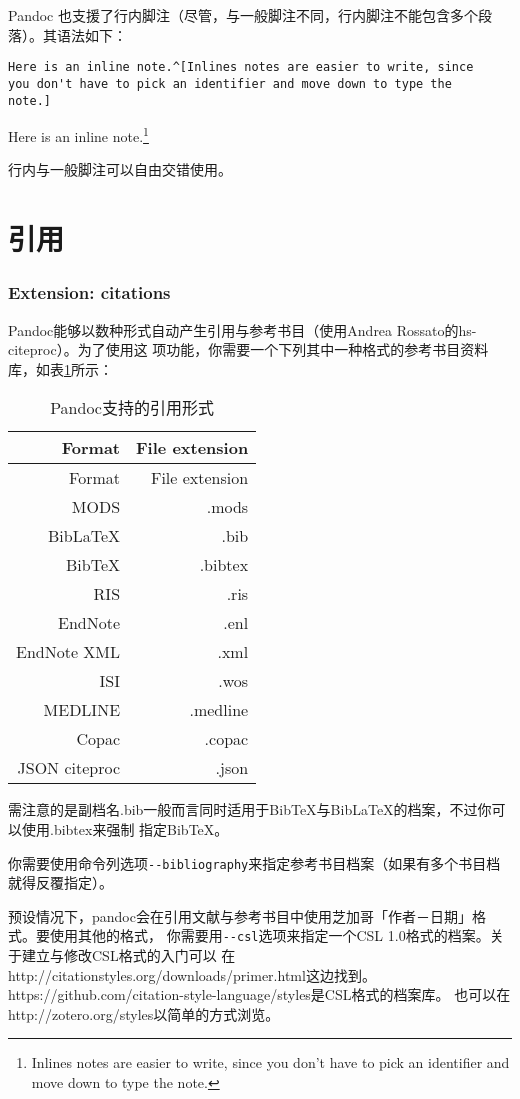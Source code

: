 \documentclass[cn]{elegantbook}
\newcommand{\passthrough}[1]{#1}
\begin{document}
Pandoc
也支援了行内脚注（尽管，与一般脚注不同，行内脚注不能包含多个段落）。其语法如下：

\begin{lstlisting}
Here is an inline note.^[Inlines notes are easier to write, since
you don't have to pick an identifier and move down to type the
note.]
\end{lstlisting}

Here is an inline note.\footnote{Inlines notes are easier to write,
  since you don't have to pick an identifier and move down to type the
  note.}

行内与一般脚注可以自由交错使用。

\hypertarget{ux5f15ux7528-1}{%
\section{引用}\label{ux5f15ux7528-1}}

\hypertarget{extension-citations}{%
\subsubsection{Extension: citations}\label{extension-citations}}

Pandoc能够以数种形式自动产生引用与参考书目（使用Andrea
Rossato的hs-citeproc）。为了使用这
项功能，你需要一个下列其中一种格式的参考书目资料库，如表\ref{table:citations}所示：

\begin{longtable}[]{@{}rr@{}}
\caption{\label{table:citations}Pandoc支持的引用形式}\tabularnewline
\toprule
Format & File extension\tabularnewline
\midrule
\endfirsthead
\toprule
Format & File extension\tabularnewline
\midrule
\endhead
MODS & .mods\tabularnewline
BibLaTeX & .bib\tabularnewline
BibTeX & .bibtex\tabularnewline
RIS & .ris\tabularnewline
EndNote & .enl\tabularnewline
EndNote XML & .xml\tabularnewline
ISI & .wos\tabularnewline
MEDLINE & .medline\tabularnewline
Copac & .copac\tabularnewline
JSON citeproc & .json\tabularnewline
\bottomrule
\end{longtable}

需注意的是副档名.bib一般而言同时适用于BibTeX与BibLaTeX的档案，不过你可以使用.bibtex来强制
指定BibTeX。

你需要使用命令列选项\passthrough{\lstinline!--bibliography!}来指定参考书目档案（如果有多个书目档就得反覆指定）。

预设情况下，pandoc会在引用文献与参考书目中使用芝加哥「作者－日期」格式。要使用其他的格式，
你需要用\passthrough{\lstinline!--csl!}选项来指定一个CSL
1.0格式的档案。关于建立与修改CSL格式的入门可以
在http://citationstyles.org/downloads/primer.html这边找到。
https://github.com/citation-style-language/styles是CSL格式的档案库。
也可以在http://zotero.org/styles以简单的方式浏览。
\end{document}
